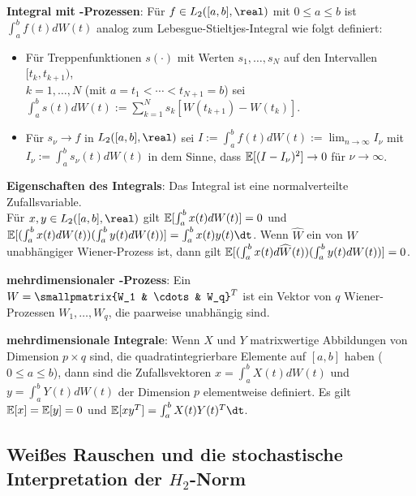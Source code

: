 \linie
\pagebreak

\textbf{Integral mit -Prozessen}:
Für $f \in L_2([a, b], \real)$ mit $0 \le a \le b$ ist
$\int_a^b f(t) dW(t)$ analog zum Lebesgue-Stieltjes-Integral wie folgt definiert:
\begin{itemize}
    \item
    Für Treppenfunktionen $s(\cdot)$ mit Werten $s_1, \dotsc, s_N$ auf den Intervallen
    $[t_k, t_{k+1})$,\\
    $k = 1, \dotsc, N$ (mit $a = t_1 < \dotsb < t_{N+1} = b$) sei
    $\int_a^b s(t) dW(t) := \sum_{k=1}^N s_k [W(t_{k+1}) - W(t_k)]$.
    
    \item
    Für $s_\nu \to f$ in $L_2([a, b], \real)$ sei
    $I := \int_a^b f(t) dW(t) := \lim_{n \to \infty} I_\nu$ mit $I_\nu := \int_a^b s_\nu(t) dW(t)$
    in dem Sinne, dass $\mathbb{E}[(I - I_\nu)^2] \to 0$ für $\nu \to \infty$.
\end{itemize}

\textbf{Eigenschaften des Integrals}:
Das Integral ist eine normalverteilte Zufallsvariable.\\
Für $x, y \in L_2([a, b], \real)$ gilt
$\mathbb{E}[\int_a^b x(t) dW(t)] = 0$ und\\
$\EE[(\int_a^b x(t) dW(t)) (\int_a^b y(t) dW(t))] = \int_a^b x(t) y(t) \dt$.
Wenn $\widehat{W}$ ein von $W$ unabhängiger Wiener-Prozess ist, dann gilt
$\mathbb{E}[(\int_a^b x(t) d\widehat{W}(t)) (\int_a^b y(t) dW(t))] = 0$.

\linie

\textbf{mehrdimensionaler -Prozess}:
Ein \\
$W = \smallpmatrix{W_1 & \cdots & W_q}^T$
ist ein Vektor von $q$ Wiener-Prozessen $W_1, \dotsc, W_q$, die paarweise unabhängig sind.

\textbf{mehrdimensionale Integrale}:
Wenn $X$ und $Y$ matrixwertige Abbildungen von Dimension $p \times q$ sind,
die quadratintegrierbare Elemente auf $[a, b]$ haben ($0 \le a \le b$), dann sind die
Zufallsvektoren $x = \int_a^b X(t) dW(t)$ und $y = \int_a^b Y(t) dW(t)$ der Dimension $p$
elementweise definiert.
Es gilt $\mathbb{E}[x] = \mathbb{E}[y] = 0$ und $\EE[xy^T] = \int_a^b X(t) Y(t)^T \dt$.

\subsection{%
    Weißes Rauschen und die stochastische Interpretation der \texorpdfstring{$H_2$-Norm}{H₂-Norm}%
}

